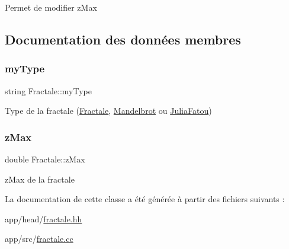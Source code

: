 Permet de modifier z\+Max 

\subsection{Documentation des données membres}
\mbox{\label{classFractale_a6e1e6ca45cb1075c4602c99f2a855a93}} 
\subsubsection{\texorpdfstring{my\+Type}{myType}}
{\footnotesize\ttfamily string Fractale\+::my\+Type\hspace{0.3cm}{\ttfamily [protected]}}

Type de la fractale (\hyperlink{classFractale}{Fractale}, \hyperlink{classMandelbrot}{Mandelbrot} ou \hyperlink{classJuliaFatou}{Julia\+Fatou}) \mbox{\label{classFractale_af7c03c738a3fb51e8e6bbc073bdbd3fe}} 
\subsubsection{\texorpdfstring{z\+Max}{zMax}}
{\footnotesize\ttfamily double Fractale\+::z\+Max\hspace{0.3cm}{\ttfamily [protected]}}

z\+Max de la fractale 

La documentation de cette classe a été générée à partir des fichiers suivants \+:\begin{DoxyCompactItemize}
\item 
app/head/\hyperlink{fractale_8hh}{fractale.\+hh}\item 
app/src/\hyperlink{fractale_8cc}{fractale.\+cc}\end{DoxyCompactItemize}
